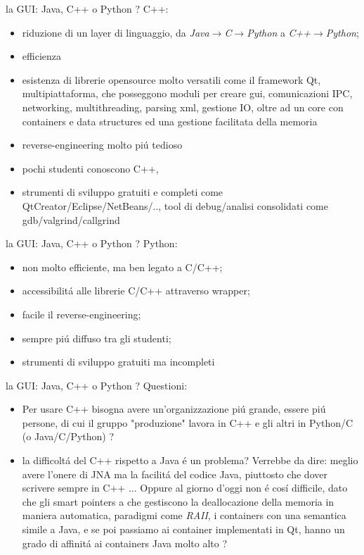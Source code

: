 \documentclass{beamer}
\begin{document}
\begin{frame}{la GUI: Java, C++ o Python ?}
C++:
\begin{itemize}
\item riduzione di un layer di linguaggio, da \textit{Java$\rightarrow$C$\rightarrow$Python} a \textit{C++$\rightarrow$Python};
\item efficienza
\item esistenza di librerie opensource molto versatili come il framework Qt, multipiattaforma, che posseggono moduli per creare gui,  comunicazioni IPC, networking, multithreading, parsing xml, gestione IO, oltre ad un core con containers e data structures  ed una gestione facilitata della memoria
\item reverse-engineering molto pi\'u tedioso
\item pochi studenti conoscono C++, 
\item strumenti di sviluppo gratuiti e completi come QtCreator/Eclipse/NetBeans/..,  tool di debug/analisi consolidati come gdb/valgrind/callgrind
\end{itemize}

\end{frame}

\begin{frame}{la GUI: Java, C++ o Python ?}
Python:
\begin{itemize}
\item non molto efficiente, ma ben legato a C/C++;
\item accessibilit\'a alle librerie C/C++  attraverso wrapper;
\item facile il reverse-engineering;
\item sempre pi\'u diffuso tra gli studenti;
\item strumenti di sviluppo gratuiti ma incompleti
\end{itemize}
\end{frame}

\begin{frame}{la GUI: Java, C++ o Python ?}
Questioni:
\begin{itemize}
\item Per usare C++ bisogna avere un'organizzazione pi\'u grande, essere pi\'u persone, di cui il gruppo "produzione" lavora
in C++ e gli altri in Python/C  (o Java/C/Python) ?
\item la difficolt\'a del C++ rispetto a Java \'e un problema? Verrebbe da dire: meglio avere l'onere di JNA ma la facilit\'a
del codice Java, piuttosto che dover scrivere sempre in C++ ... Oppure al giorno d'oggi non \'e cos\'i difficile, dato che
gli smart pointers a che gestiscono la deallocazione della memoria in maniera automatica, paradigmi come \textit{RAII},
i containers con una semantica simile a Java, e se poi passiamo ai container implementati in Qt, hanno un grado di affinit\'a
ai containers Java molto alto ?
\end{itemize}
\end{frame}
\end{document}

